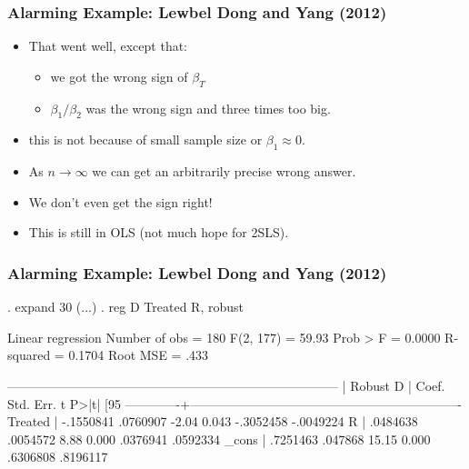 \documentclass[aspectratio=169]{beamer}
\begin{document}
\begin{frame}[fragile]
\frametitle{Alarming Example: Lewbel Dong and Yang (2012)}
\begin{itemize}
\item That went well, except that:
\begin{itemize}
\item we got the wrong sign of $\beta_T$
\item $\beta_1/\beta_2$ was the wrong sign and three times too big.
\end{itemize}
\item this is not because of small sample size or $\beta_1 \approx 0$.
\item As $n \rightarrow \infty$ we can get an arbitrarily precise wrong answer.
\item We don't even get the sign right!
\item This is still in OLS (not much hope for 2SLS).
\end{itemize}
\end{frame}

\begin{frame}[fragile]
\frametitle{Alarming Example: Lewbel Dong and Yang (2012)}
\tiny
\begin{semiverbatim}
. expand 30
(...)
. reg D Treated R, robust

Linear regression                               Number of obs     =        180
                                                F(2, 177)         =      59.93
                                                Prob > F          =     0.0000
                                                R-squared         =     0.1704
                                                Root MSE          =       .433

------------------------------------------------------------------------------
             |               Robust
           D |      Coef.   Std. Err.      t    P>|t|     [95%
-------------+----------------------------------------------------------------
     Treated |  -.1550841   .0760907    -2.04   0.043    -.3052458   -.0049224
           R |   .0484638   .0054572     8.88   0.000     .0376941    .0592334
       _cons |   .7251463    .047868    15.15   0.000     .6306808    .8196117
\end{semiverbatim}
\end{frame}
\end{document}
